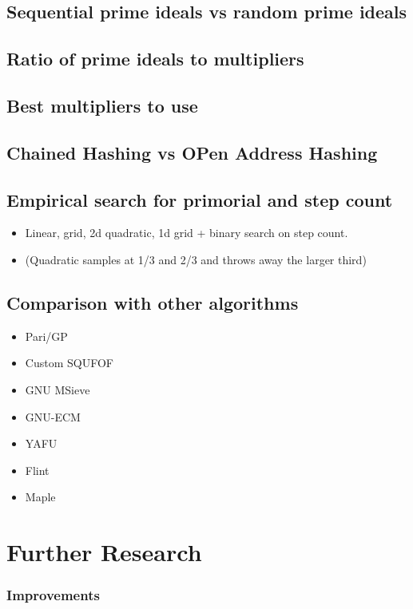 \documentclass{ucalgthes1}
\theoremstyle{definition}
\begin{document}
\section{Sequential prime ideals vs random prime ideals}

\section{Ratio of prime ideals to multipliers}

\section{Best multipliers to use}

\section{Chained Hashing vs OPen Address Hashing}

\section{Empirical search for primorial and step count}
\begin{itemize}
\item Linear, grid, 2d quadratic, 1d grid + binary search on step count.
\item (Quadratic samples at 1/3 and 2/3 and throws away the larger third)
\end{itemize}

\section{Comparison with other algorithms}
\begin{itemize}
\item Pari/GP
\item Custom SQUFOF
\item GNU MSieve
\item GNU-ECM
\item YAFU
\item Flint
\item Maple
\end{itemize}

\chapter{Further Research}

\subsection{Improvements}
\end{document}
